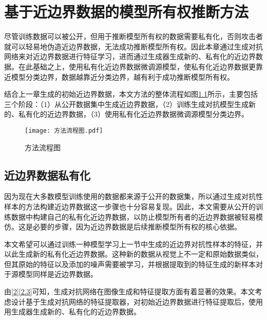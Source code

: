 
\chapter{基于近边界数据的模型所有权推断方法}\label{4}

尽管训练数据可以被公开，但用于推断模型所有权的数据需要私有化，否则攻击者就可以轻易地伪造近边界数据，无法成功推断模型所有权。因此本章通过生成对抗网络来对近边界数据进行特征学习，进而通过生成器生成新的、私有化的近边界数据。在此基础之上，使用私有化近边界数据微调源模型，使私有化近边界数据更靠近模型分类边界，数据越靠近分类边界，越有利于成功推断模型所有权。

结合上一章生成的初始近边界数据，本文方法的整体流程如图\ref{方法流程图}所示，主要包括三个阶段：（1）从公开数据集中生成近边界数据，（2）训练生成对抗模型生成新的、私有化的近边界数据，（3）使用私有化近边界数据微调源模型分类边界。

\begin{figure}[htbp]%
	\centering
	\setlength{\abovecaptionskip}{5mm} %
	\texttt{[image: 方法流程图.pdf]}
	\caption{方法流程图}
	\label{方法流程图}
	\end {figure}



\section{近边界数据私有化}\label{4.1}

因为现在大多数模型训练使用的数据都来源于公开的数据集，所以通过生成对抗性样本的方法构建近边界数据这一步骤也十分容易复现。因此，本文需要从公开的训练数据中构建自己的私有化近边界数据，以防止模型所有者的近边界数据被轻易模仿。这是必要的步骤，因为近边界数据是后续推断模型所有权的核心依据。

本文希望可以通过训练一种模型学习上一节中生成的近边界对抗性样本的特征，并以此生成新的私有化近边界数据。这种新的数据从视觉上不一定和原始数据类似，但其原始的特征以及添加的噪声需要被学习，并根据提取到的特征生成的新样本对于源模型同样是近边界数据。

由\ref{2}\ref{2.3}可知，生成对抗网络在图像生成和特征提取方面有着显著的效果。本文考虑设计基于生成对抗网络的特征提取器，对初始近边界数据进行特征提取后，使用用生成器生成新的、私有化的近边界数据。

